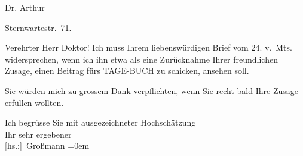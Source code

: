 \pstart
           \raggedleft{}Dr. Arthur \pend
           
\pstart
           \raggedleft{}\pend
           
\pstart
           \raggedleft{}Sternwartestr. 71.\pend
           
\pstart\center{}Verehrter Herr Doktor!\pend\vspace{0.5em}
\pstart
           Ich muss Ihrem liebenswürdigen Brief vom 24. v. Mts. widersprechen, wenn
               ich ihn etwa als eine Zurücknahme Ihrer freundlichen Zusage, einen Beitrag fürs TAGE-BUCH zu schicken, ansehen soll.\pend
           
\pstart
           Sie würden mich zu grossem Dank verpflichten, wenn Sie recht bald Ihre Zusage
               erfüllen wollten.\pend
           
\pstart
           Ich begrüsse Sie mit ausgezeichneter Hochschätzung{\\[\baselineskip]}Ihr sehr ergebener{\\[\baselineskip]}\spacefill\mbox{{[}hs.:{]} Großmann}\pend
           \leftskip=0em{}\endnumbering{}  
      